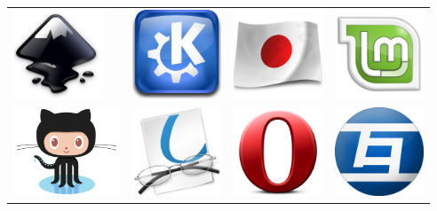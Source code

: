 \begin{tabular}{llll}
\href{http://inkscape.org/}{\includegraphics[height=100px]{img/thanks/inkscape.png}} &
\href{http://www.kde.org/}{\includegraphics[height=100px]{img/thanks/kde.png}} &
\href{http://edu.kde.org/kiten/}{\includegraphics[height=100px]{img/thanks/kiten.png}} &
\href{http://www.linuxmint.com/}{\includegraphics[height=100px]{img/thanks/linuxmint.png}}\\

\href{https://github.com/}{\includegraphics[height=100px]{img/thanks/octocat.png}} &
\href{http://okular.kde.org/}{\includegraphics[height=100px]{img/thanks/okular.png}} &
\href{http://www.opera.com/}{\includegraphics[height=100px]{img/thanks/opera.png}} &
\href{http://www.tagaini.net/}{\includegraphics[height=100px]{img/thanks/tagainijisho.png}}\\


\end{tabular}
